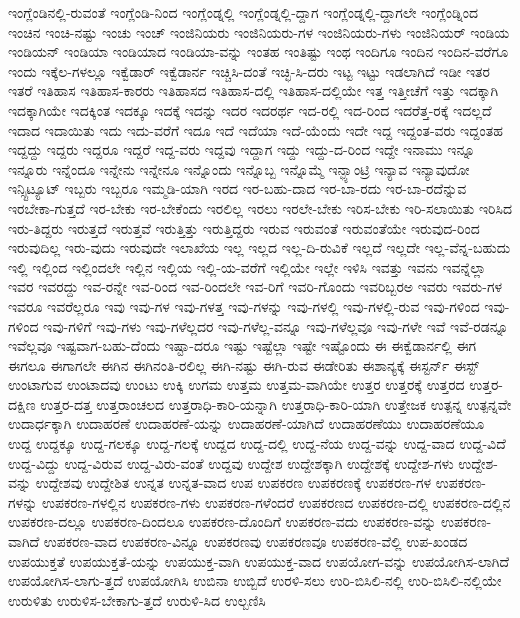 {ಇಂಗ್ಲೆಂಡಿನಲ್ಲಿ-ರುವಂತೆ
ಇಂಗ್ಲೆಂಡಿ-ನಿಂದ
ಇಂಗ್ಲೆಂಡ್ನಲ್ಲಿ
ಇಂಗ್ಲೆಂಡ್ನಲ್ಲಿ-ದ್ದಾಗ
ಇಂಗ್ಲೆಂಡ್ನಲ್ಲಿ-ದ್ದಾಗಲೇ
ಇಂಗ್ಲೆಂಡ್ನಿಂದ
ಇಂಚಿನ
ಇಂಚಿ-ನಷ್ಟು
ಇಂಚು
ಇಂಚ್
ಇಂಜಿನಿಯರು
ಇಂಜಿನಿಯರು-ಗಳ
ಇಂಜಿನಿಯರು-ಗಳು
ಇಂಜಿನಿಯರ್
ಇಂಡಿಯ
ಇಂಡಿಯನ್
ಇಂಡಿಯಾ
ಇಂಡಿಯಾದ
ಇಂಡಿಯಾ-ವನ್ನು
ಇಂತಹ
ಇಂತಿಷ್ಟು
ಇಂಥ
ಇಂದಿಗೂ
ಇಂದಿನ
ಇಂದಿನ-ವರೆಗೂ
ಇಂದು
ಇಕ್ಕೆಲ-ಗಳಲ್ಲೂ
ಇಕ್ವೆಡಾರ್
ಇಕ್ವೆಡಾರ್ನ
ಇಚ್ಚಿಸಿ-ದಂತೆ
ಇಚ್ಛಿ-ಸಿ-ದರು
ಇಟ್ಟ
ಇಟ್ಟು
ಇಡಲಾಗಿದೆ
ಇಡೀ
ಇತರ
ಇತರೆ
ಇತಿಹಾಸ
ಇತಿಹಾಸ-ಕಾರರು
ಇತಿಹಾಸದ
ಇತಿಹಾಸ-ದಲ್ಲಿ
ಇತಿಹಾಸ-ದಲ್ಲಿಯೇ
ಇತ್ತ
ಇತ್ತೀಚೆಗೆ
ಇತ್ತು
ಇದಕ್ಕಾಗಿ
ಇದಕ್ಕಾಗಿಯೇ
ಇದಕ್ಕಿಂತ
ಇದಕ್ಕೂ
ಇದಕ್ಕೆ
ಇದನ್ನು
ಇದರ
ಇದರರ್ಥ
ಇದ-ರಲ್ಲಿ
ಇದ-ರಿಂದ
ಇದರೆತ್ತ-ರಕ್ಕೆ
ಇದಲ್ಲದೆ
ಇದಾದ
ಇದಾಯಿತು
ಇದು
ಇದು-ವರೆಗೆ
ಇದೂ
ಇದೆ
ಇದೆಯಾ
ಇದೆ-ಯೆಂದು
ಇದೇ
ಇದ್ದ
ಇದ್ದಂತ-ವರು
ಇದ್ದಂತಹ
ಇದ್ದದ್ದು
ಇದ್ದರು
ಇದ್ದರೂ
ಇದ್ದರೆ
ಇದ್ದ-ವರು
ಇದ್ದವು
ಇದ್ದಾಗ
ಇದ್ದು
ಇದ್ದು-ದ-ರಿಂದ
ಇದ್ದೇ
ಇನಾಮು
ಇನ್ನೂ
ಇನ್ನೂರು
ಇನ್ನೆಂದೂ
ಇನ್ನೇನು
ಇನ್ನೇನೂ
ಇನ್ನೊಂದು
ಇನ್ನೊಬ್ಬ
ಇನ್ನೊಮ್ಮೆ
ಇನ್ಫ್ಯಾಂಟ್ರಿ
ಇನ್ಯಾವ
ಇನ್ಯಾವುದೋ
ಇನ್ಸ್ಟಿಟ್ಯೂಟ್
ಇಬ್ಬರು
ಇಬ್ಬರೂ
ಇಮ್ಮಡಿ-ಯಾಗಿ
ಇರದ
ಇರ-ಬಹು-ದಾದ
ಇರ-ಬಾ-ರದು
ಇರ-ಬಾ-ರದೆನ್ನುವ
ಇರಬೇಕಾ-ಗುತ್ತದೆ
ಇರ-ಬೇಕು
ಇರ-ಬೇಕೆಂದು
ಇರಲಿಲ್ಲ
ಇರಲು
ಇರಲೇ-ಬೇಕು
ಇರಿಸ-ಬೇಕು
ಇರಿ-ಸಲಾಯಿತು
ಇರಿಸಿದ
ಇರು-ತಿದ್ದರು
ಇರುತ್ತದೆ
ಇರುತ್ತವೆ
ಇರುತ್ತಿತ್ತು
ಇರುತ್ತಿದ್ದರು
ಇರುವ
ಇರುವಂತೆ
ಇರುವಂತೆಯೇ
ಇರುವುದ-ರಿಂದ
ಇರುವುದಿಲ್ಲ
ಇರು-ವುದು
ಇರುವುದೇ
ಇಲಾಖೆಯ
ಇಲ್ಲ
ಇಲ್ಲದ
ಇಲ್ಲ-ದಿ-ರುವಿಕೆ
ಇಲ್ಲದೆ
ಇಲ್ಲದೇ
ಇಲ್ಲ-ವೆನ್ನ-ಬಹುದು
ಇಲ್ಲಿ
ಇಲ್ಲಿಂದ
ಇಲ್ಲಿಂದಲೇ
ಇಲ್ಲಿನ
ಇಲ್ಲಿಯ
ಇಲ್ಲಿ-ಯ-ವರೆಗೆ
ಇಲ್ಲಿಯೇ
ಇಲ್ಲೇ
ಇಳಿಸಿ
ಇವತ್ತು
ಇವನು
ಇವನ್ನೆಲ್ಲಾ
ಇವರ
ಇವರದ್ದು
ಇವ-ರನ್ನೇ
ಇವ-ರಿಂದ
ಇವ-ರಿಂದಲೇ
ಇವ-ರಿಗೆ
ಇವರಿ-ಗೊಂದು
ಇವರಿಬ್ಬರಅ
ಇವರು
ಇವರು-ಗಳ
ಇವರೂ
ಇವರೆಲ್ಲರೂ
ಇವು
ಇವು-ಗಳ
ಇವು-ಗಳತ್ತ
ಇವು-ಗಳನ್ನು
ಇವು-ಗಳಲ್ಲಿ
ಇವು-ಗಳಲ್ಲಿ-ರುವ
ಇವು-ಗಳಿಂದ
ಇವು-ಗಳಿಂದ
ಇವು-ಗಳಿಗೆ
ಇವು-ಗಳು
ಇವು-ಗಳೆಲ್ಲದರ
ಇವು-ಗಳೆಲ್ಲ-ವನ್ನೂ
ಇವು-ಗಳೆಲ್ಲವೂ
ಇವು-ಗಳೇ
ಇವೆ
ಇವೆ-ರಡನ್ನೂ
ಇವೆಲ್ಲವೂ
ಇಷ್ಟವಾಗ-ಬಹು-ದೆಂದು
ಇಷ್ಟಾ-ದರೂ
ಇಷ್ಟು
ಇಷ್ಟೆಲ್ಲಾ
ಇಷ್ಟೇ
ಇಷ್ಟೊಂದು
ಈ
ಈಕ್ವೆಡಾರ್ನಲ್ಲಿ
ಈಗ
ಈಗಲೂ
ಈಗಾಗಲೇ
ಈಗಿನ
ಈಗಿನಂತಿ-ರಲಿಲ್ಲ
ಈಗಿ-ನಷ್ಟು
ಈಗಿ-ರುವ
ಈಡೇರಿತು
ಈಶಾನ್ಯಕ್ಕೆ
ಈಸ್ಟರ್ನ್
ಈಸ್ಟ್
ಉಂಟಾಗುವ
ಉಂಟಾದವು
ಉಂಟು
ಉಕ್ಕಿ
ಉಗಮ
ಉತ್ತಮ
ಉತ್ತಮ-ವಾಗಿಯೇ
ಉತ್ತರ
ಉತ್ತರಕ್ಕೆ
ಉತ್ತರದ
ಉತ್ತರ-ದಕ್ಷಿಣ
ಉತ್ತರ-ದತ್ತ
ಉತ್ತರಾಂಚಲದ
ಉತ್ತರಾಧಿ-ಕಾರಿ-ಯನ್ನಾಗಿ
ಉತ್ತರಾಧಿ-ಕಾರಿ-ಯಾಗಿ
ಉತ್ತೇಜಕ
ಉತ್ಪನ್ನ
ಉತ್ಪನ್ನವೇ
ಉದಾರ್ಧಕ್ಕಾಗಿ
ಉದಾಹರಣೆ
ಉದಾಹರಣೆ-ಯನ್ನು
ಉದಾಹರಣೆ-ಯಾಗಿದೆ
ಉದಾಹರಣೆಯು
ಉದಾಹರಣೆಯೂ
ಉದ್ದ
ಉದ್ದಕ್ಕೂ
ಉದ್ದ-ಗಲಕ್ಕೂ
ಉದ್ದ-ಗಲಕ್ಕೆ
ಉದ್ದದ
ಉದ್ದ-ದಲ್ಲಿ
ಉದ್ದ-ನೆಯ
ಉದ್ದ-ವನ್ನು
ಉದ್ದ-ವಾದ
ಉದ್ದ-ವಿದೆ
ಉದ್ದ-ವಿದ್ದು
ಉದ್ದ-ವಿರುವ
ಉದ್ದ-ವಿರು-ವಂತೆ
ಉದ್ದವು
ಉದ್ದೇಶ
ಉದ್ದೇಶಕ್ಕಾಗಿ
ಉದ್ದೇಶಕ್ಕೆ
ಉದ್ದೇಶ-ಗಳು
ಉದ್ದೇಶ-ವನ್ನು
ಉದ್ದೇಶವು
ಉದ್ದೇಶಿತ
ಉನ್ನತ
ಉನ್ನತ-ವಾದ
ಉಪ
ಉಪಕರಣ
ಉಪಕರಣಕ್ಕೆ
ಉಪಕರಣ-ಗಳ
ಉಪಕರಣ-ಗಳನ್ನು
ಉಪಕರಣ-ಗಳಲ್ಲಿನ
ಉಪಕರಣ-ಗಳು
ಉಪಕರಣ-ಗಳೆಂದರೆ
ಉಪಕರಣದ
ಉಪಕರಣ-ದಲ್ಲಿ
ಉಪಕರಣ-ದಲ್ಲಿನ
ಉಪಕರಣ-ದಲ್ಲೂ
ಉಪಕರಣ-ದಿಂದಲೂ
ಉಪಕರಣ-ದೊಂದಿಗೆ
ಉಪಕರಣ-ವದು
ಉಪಕರಣ-ವನ್ನು
ಉಪಕರಣ-ವಾಗಿದೆ
ಉಪಕರಣ-ವಾದ
ಉಪಕರಣ-ವಿನ್ನೂ
ಉಪಕರಣವು
ಉಪಕರಣವೂ
ಉಪಕರಣ-ವೆಲ್ಲಿ
ಉಪ-ಖಂಡದ
ಉಪಯುಕ್ತತೆ
ಉಪಯುಕ್ತತೆ-ಯನ್ನು
ಉಪಯುಕ್ತ-ವಾಗಿ
ಉಪಯುಕ್ತ-ವಾದ
ಉಪಯೋಗ-ವನ್ನು
ಉಪಯೋಗಿಸ-ಲಾಗಿದೆ
ಉಪಯೋಗಿಸ-ಲಾಗು-ತ್ತದೆ
ಉಪಯೋಗಿಸಿ
ಉಬಿನಾ
ಉಬ್ಬಿದೆ
ಉರಳಿ-ಸಲು
ಉರಿ-ಬಿಸಿಲಿ-ನಲ್ಲಿ
ಉರಿ-ಬಿಸಿಲಿ-ನಲ್ಲಿಯೇ
ಉರುಳಿತು
ಉರುಳಿಸ-ಬೇಕಾಗು-ತ್ತದೆ
ಉರುಳಿ-ಸಿದ
ಉಲ್ಬಣಿಸಿ
}
